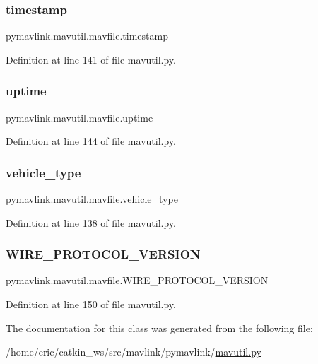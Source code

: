 \subsubsection{\texorpdfstring{timestamp}{timestamp}}
{\footnotesize\ttfamily pymavlink.\+mavutil.\+mavfile.\+timestamp}



Definition at line 141 of file mavutil.\+py.

\mbox{\label{classpymavlink_1_1mavutil_1_1mavfile_a37502153c0413757a34aa2bbe7b9db54}} 
\subsubsection{\texorpdfstring{uptime}{uptime}}
{\footnotesize\ttfamily pymavlink.\+mavutil.\+mavfile.\+uptime}



Definition at line 144 of file mavutil.\+py.

\mbox{\label{classpymavlink_1_1mavutil_1_1mavfile_a7a95b597163c1661c47ee3f3b1ced072}} 
\subsubsection{\texorpdfstring{vehicle\_type}{vehicle\_type}}
{\footnotesize\ttfamily pymavlink.\+mavutil.\+mavfile.\+vehicle\+\_\+type}



Definition at line 138 of file mavutil.\+py.

\mbox{\label{classpymavlink_1_1mavutil_1_1mavfile_a48a9748e550310c4c276857ff0712b96}} 
\subsubsection{\texorpdfstring{WIRE\_PROTOCOL\_VERSION}{WIRE\_PROTOCOL\_VERSION}}
{\footnotesize\ttfamily pymavlink.\+mavutil.\+mavfile.\+W\+I\+R\+E\+\_\+\+P\+R\+O\+T\+O\+C\+O\+L\+\_\+\+V\+E\+R\+S\+I\+ON}



Definition at line 150 of file mavutil.\+py.



The documentation for this class was generated from the following file\+:\begin{DoxyCompactItemize}
\item 
/home/eric/catkin\+\_\+ws/src/mavlink/pymavlink/\mbox{\hyperlink{mavutil_8py}{mavutil.\+py}}\end{DoxyCompactItemize}
